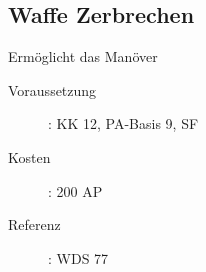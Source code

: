 \subsection{Waffe Zerbrechen}
\label{sf.waffe_zerbrechen}
Ermöglicht das Manöver 
\begin{description}
    \item[Voraussetzung]:
        KK 12, PA-Basis 9, SF 
    \item [Kosten]:
        200 AP
    \item [Referenz]:
        WDS 77
\end{description}
